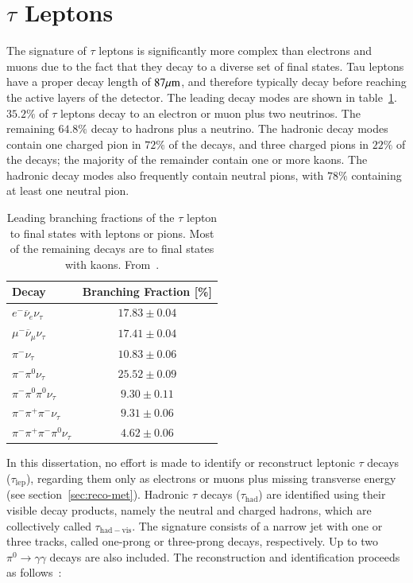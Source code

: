 \section{$\tau$ Leptons}\label{sec:event-reconstruction-taus}
The signature of $\tau$ leptons is significantly more complex than electrons and muons due to the fact that they decay to a diverse set of final states. Tau leptons have a proper decay length of $87 \mu\mathrm{m}$, and therefore typically decay before reaching the active layers of the detector. The leading decay modes are shown in table~\ref{table:reco-tau-decays}. $35.2\%$ of $\tau$ leptons decay to an electron or muon plus two neutrinos. The remaining $64.8\%$ decay to hadrons plus a neutrino. The hadronic decay modes contain one charged pion in $72\%$ of the decays, and three charged pions in $22\%$ of the decays; the majority of the remainder contain one or more kaons. The hadronic decay modes also frequently contain neutral pions, with $78\%$ containing at least one neutral pion. 


\begin{table}[htbp]
	\centering
	\begin{tabular}{|l|c|}
		\hline
		Decay & Branching Fraction [\%] \\
		\hline
		$e^- \overline{\nu}_e \nu_{\tau}$ & $17.83 \pm 0.04$ \\
		\hline
		$\mu^- \overline{\nu}_{\mu} \nu_{\tau}$ & $17.41 \pm 0.04$ \\
		\hline
		$\pi^- \nu_{\tau}$ & $10.83 \pm 0.06$ \\
		\hline
		$\pi^- \pi^0 \nu_{\tau}$ & $25.52 \pm 0.09$ \\
		\hline
		$\pi^- \pi^0\pi^0\nu_{\tau}$ & $ 9.30 \pm 0.11$ \\
		\hline
		$\pi^-\pi^+\pi^-\nu_{\tau}$ & $9.31 \pm 0.06$ \\
		\hline
		$\pi^-\pi^+\pi^-\pi^0\nu_{\tau}$ & $4.62 \pm 0.06$ \\
		\hline
	\end{tabular}
	\caption{Leading branching fractions of the $\tau$ lepton to final states with leptons or pions. Most of the remaining decays are to final states with kaons. From~\cite{pdg}.}
	\label{table:reco-tau-decays}
\end{table}

In this dissertation, no effort is made to identify or reconstruct leptonic $\tau$ decays ($\tau_{\mathrm{lep}}$), regarding them only as electrons or muons plus missing transverse energy (see section~\ref{sec:reco-met}). Hadronic $\tau$ decays ($\tau_{\mathrm{had}}$) are identified using their visible decay products, namely the neutral and charged hadrons, which are collectively called $\tau_{\mathrm{had-vis}}$. The signature consists of a narrow jet with one or three tracks, called one-prong or three-prong decays, respectively. Up to two $\pi^0\rightarrow\gamma\gamma$ decays are also included. The reconstruction and identification proceeds as follows~\cite{TheATLASCollaboration:2014tga}:

